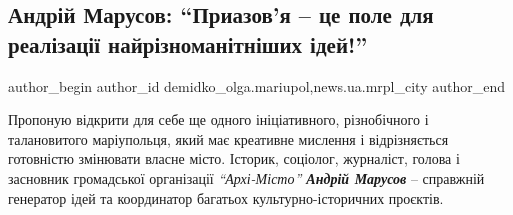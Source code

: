  
 
 
 
 
 
\subsection{Андрій Марусов: \enquote{Приазов'я – це поле для реалізації найрізноманітніших ідей!}}
\label{sec:17_12_2019.stz.news.ua.mrpl_city.1.andrij_marusov_priazovja_idei}
 
\ifcmt
 author_begin
   author_id demidko_olga.mariupol,news.ua.mrpl_city
 author_end
\fi

Пропоную відкрити для себе ще одного ініціативного, різнобічного і талановитого
маріупольця, який має креативне мислення і відрізняється готовністю змінювати
власне місто. Історик, соціолог, журналіст, голова і засновник громадської
організації \emph{\enquote{Архі-Місто} \textbf{Андрій Марусов}} – справжній генератор ідей та
координатор багатьох культурно-історичних проєктів.

